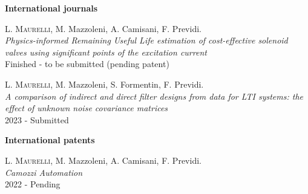 \documentclass[10pt]{article}
\newcommand{\cvsection}[1]{\section*{\centering\normalsize\uppercase{#1}}\vspace{-16pt}\rule{\linewidth}{0.2pt}\vspace{6pt}}
\begin{document}
\textbf{International journals}
\begin{enumerate}[label={[J0{\arabic*}]}]
	\setlength\itemsep{-3pt}
	\item \label{j2022}\textsc{L. Maurelli}, M. Mazzoleni, A. Camisani, F. Previdi.\\
	\textit{Physics-informed Remaining Useful Life estimation of cost-effective solenoid
	valves using significant points of the excitation current}\\
	Finished - to be submitted (pending patent)
	\item \label{j02}\textsc{L. Maurelli}, M. Mazzoleni, S. Formentin, F. Previdi.\\
	\textit{A comparison of indirect and direct filter designs from data for LTI systems: the effect of unknown noise covariance matrices}\\
	2023 - Submitted
\end{enumerate}
\textbf{International patents}
\begin{enumerate}[label={[P0{\arabic*}]}]
	\setlength\itemsep{-3pt}
	\item \label{p2022}\textsc{L. Maurelli}, M. Mazzoleni, A. Camisani, F. Previdi.\\
	\textit{Camozzi Automation}\\
	2022 - Pending
\end{enumerate}


\end{document}
